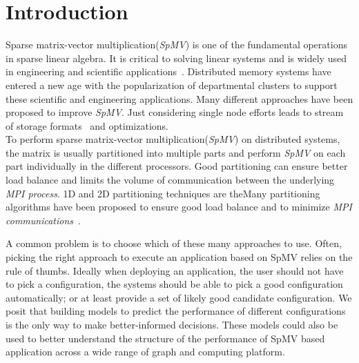 \documentclass[sigconf,review,anonymous]{acmart}
\begin{document}
\section{Introduction}
Sparse matrix-vector multiplication(\textit{SpMV}) is one of the
fundamental operations in sparse linear algebra. It is critical to
solving linear systems and is widely used in engineering and
scientific applications~\cite{gleich2015pagerank, saad2003iterative,
  dytrych2016efficacy}.  Distributed memory systems have entered a new
age with the popularization of departmental clusters to support these
scientific and engineering applications.  Many different approaches
have been proposed to improve \textit{SpMV}. Just considering single
node efforts leads to stream of storage formats~\cite{ashari2014fast, ashari2014efficient, baskaran2009optimizing, bell2009implementing, buluc2011reduced, bulucc2009parallel, choi2010model, deng2009taming, garland2008sparse, greathouse2014efficient, kourtis2010exploiting, li2013smat, li2013gpu, liu2013efficient, su2012clspmv, tang2015optimizing, vuduc2005oski, williams2007optimization, yan2014yaspmv} and optimizations. 
\\
To perform sparse matrix-vector multiplication(\textit{SpMV}) on
distributed systems, the matrix is usually partitioned into multiple
parts and perform \textit{SpMV} on each part individually in the
different processors. Good partitioning can ensure better load balance
and limits the volume of communication between the underlying
\textit{MPI process}. 1D and 2D partitioning techniques are theMany partitioning algorithms have been proposed
to ensure good load balance and to minimize \textit{MPI communications}~\cite{deveci2015hypergraph, karypis1995multilevel,kaya2013analysis}.

A common problem is to choose which of these many approaches to use.
Often, picking the right approach to execute an application based on
SpMV relies on the rule of thumbs. Ideally when deploying an
application, the user should not have to pick a configuration, the
systems should be able to pick a good configuration automatically; or
at least provide a set of likely good candidate configuration. We
posit that building models to predict the performance of different
configurations is the only way to make better-informed
decisions. These models could also be used to better understand the
structure of the performance of SpMV based application across a wide
range of graph and computing platform.
\end{document}
